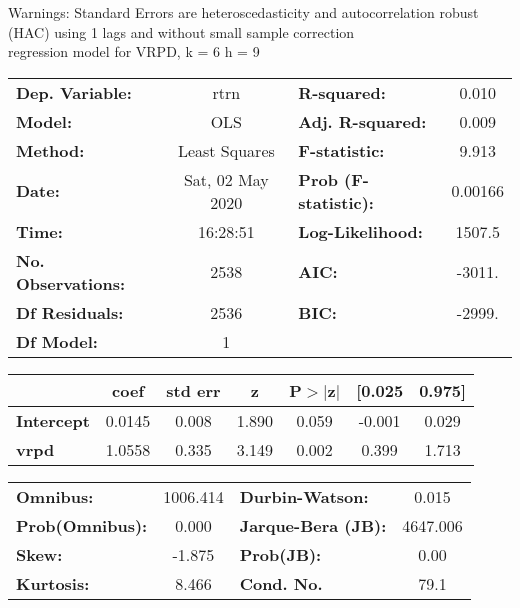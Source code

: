 Warnings: \newline
 [1] Standard Errors are heteroscedasticity and autocorrelation robust (HAC) using 1 lags and without small sample correction\\ 

regression model for VRPD, k = 6 h = 9\begin{center}
\begin{tabular}{lclc}
\toprule
\textbf{Dep. Variable:}    &       rtrn       & \textbf{  R-squared:         } &     0.010   \\
\textbf{Model:}            &       OLS        & \textbf{  Adj. R-squared:    } &     0.009   \\
\textbf{Method:}           &  Least Squares   & \textbf{  F-statistic:       } &     9.913   \\
\textbf{Date:}             & Sat, 02 May 2020 & \textbf{  Prob (F-statistic):} &  0.00166    \\
\textbf{Time:}             &     16:28:51     & \textbf{  Log-Likelihood:    } &    1507.5   \\
\textbf{No. Observations:} &        2538      & \textbf{  AIC:               } &    -3011.   \\
\textbf{Df Residuals:}     &        2536      & \textbf{  BIC:               } &    -2999.   \\
\textbf{Df Model:}         &           1      & \textbf{                     } &             \\
\bottomrule
\end{tabular}
\begin{tabular}{lcccccc}
                   & \textbf{coef} & \textbf{std err} & \textbf{z} & \textbf{P$> |$z$|$} & \textbf{[0.025} & \textbf{0.975]}  \\
\midrule
\textbf{Intercept} &       0.0145  &        0.008     &     1.890  &         0.059        &       -0.001    &        0.029     \\
\textbf{vrpd}      &       1.0558  &        0.335     &     3.149  &         0.002        &        0.399    &        1.713     \\
\bottomrule
\end{tabular}
\begin{tabular}{lclc}
\textbf{Omnibus:}       & 1006.414 & \textbf{  Durbin-Watson:     } &    0.015  \\
\textbf{Prob(Omnibus):} &   0.000  & \textbf{  Jarque-Bera (JB):  } & 4647.006  \\
\textbf{Skew:}          &  -1.875  & \textbf{  Prob(JB):          } &     0.00  \\
\textbf{Kurtosis:}      &   8.466  & \textbf{  Cond. No.          } &     79.1  \\
\bottomrule
\end{tabular}
\end{center}

